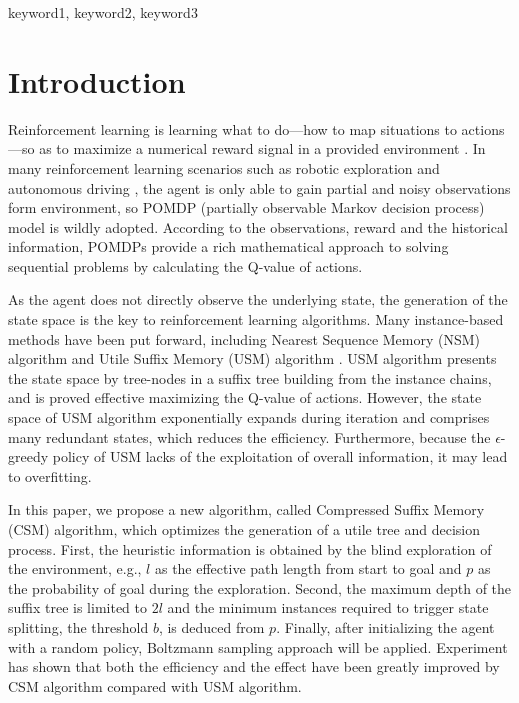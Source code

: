 \documentclass[conference]{IEEEtran}
\begin{document}
	\begin{IEEEkeywords}
		keyword1, keyword2, keyword3
	\end{IEEEkeywords}
	
	
	\section{Introduction}
	
	Reinforcement learning is learning what to do—how to map situations to actions—so
	as to maximize a numerical reward signal in a provided environment
	\cite{sutton2018reinforcement}. In many reinforcement learning scenarios such as
	robotic exploration \cite{smith2007probabilistic} and autonomous driving
	\cite{bai2015intention}, the agent is only able to gain partial and noisy
	observations form environment, so POMDP (partially observable Markov decision
	process) model is wildly adopted. According to the observations, reward and the
	historical information, POMDPs provide a rich mathematical approach to solving
	sequential problems by calculating the Q-value of actions.
	
	As the agent does not directly observe the underlying state, the generation of
	the state space is the key to reinforcement learning algorithms.
	Many instance-based methods have been put forward, including Nearest Sequence
	Memory (NSM) algorithm \cite{mccallum1997reinforcement} and Utile Suffix Memory
	(USM) algorithm \cite{mccallum1995instance}. USM algorithm presents the state space by
	tree-nodes in a suffix tree building from the instance chains, and is proved
	effective maximizing the Q-value of actions. However, the state space of USM
	algorithm exponentially expands during iteration and comprises many redundant
	states, which reduces the efficiency. Furthermore, because the $\epsilon$-greedy
	policy of USM lacks of the exploitation of overall information, it may lead to
	overfitting.
	
	In this paper, we propose a new algorithm, called Compressed Suffix Memory (CSM)
	algorithm, which optimizes the generation of a utile tree and decision process.
	First, the heuristic information is obtained by the blind exploration
	of the environment, e.g., $l$ as the effective path length from start to goal
	and $p$ as the probability of goal during the exploration. Second, the maximum
	depth of the suffix tree is limited to $2l$ and the minimum instances required
	to trigger state splitting, the threshold $b$, is deduced from $p$. Finally, after initializing the agent
	with a random policy, Boltzmann sampling approach will be applied. Experiment has shown
	that both the efficiency and the effect have been greatly improved by CSM algorithm compared
	with USM algorithm.
	
\end{document}
